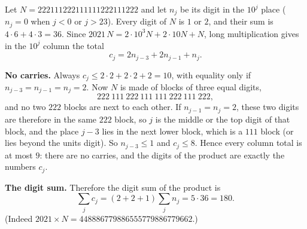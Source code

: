 Let $N=222111222111111222111222$ and let $n_j$ be its digit in the $10^j$ place ($n_j=0$ when $j<0$ or $j>23$). Every digit of $N$ is $1$ or $2$, and their sum is $4\cdot6+4\cdot3=36$. Since $2021\,N=2\cdot10^3N+2\cdot10N+N$, long multiplication gives in the $10^j$ column the total
\[c_j=2n_{j-3}+2n_{j-1}+n_j.\]

\textbf{No carries.} Always $c_j\le2\cdot2+2\cdot2+2=10$, with equality only if $n_{j-3}=n_{j-1}=n_j=2$. Now $N$ is made of blocks of three equal digits,
\[222\ 111\ 222\ 111\ 111\ 222\ 111\ 222,\]
and no two $222$ blocks are next to each other. If $n_{j-1}=n_j=2$, these two digits are therefore in the same $222$ block, so $j$ is the middle or the top digit of that block, and the place $j-3$ lies in the next lower block, which is a $111$ block (or lies beyond the units digit). So $n_{j-3}\le1$ and $c_j\le8$. Hence every column total is at most $9$: there are no carries, and the digits of the product are exactly the numbers $c_j$.

\textbf{The digit sum.} Therefore the digit sum of the product is
\[\sum_j c_j=(2+2+1)\sum_j n_j=5\cdot36=\boxed{180}.\]
(Indeed $2021\times N=448886779886555779886779662$.)
